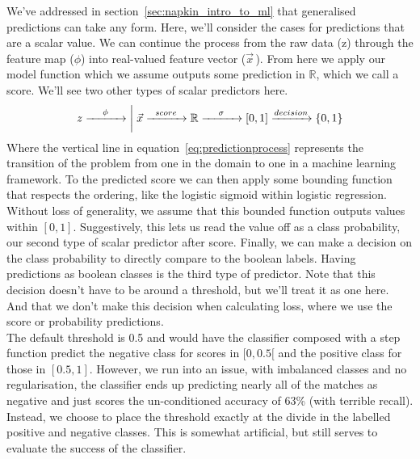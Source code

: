 \documentclass[12pt,a4paper]{article}
\begin{document}
We've addressed in section~\ref{sec:napkin_intro_to_ml} that generalised predictions can take any form. Here, we'll consider the cases for predictions that are a scalar value. We can continue the process from the raw data (z) through the feature map ($\phi$) into real-valued feature vector ($\vec{x}$\,). From here we apply our model function which we assume outputs some prediction in $\mathbb{R}$, which we call a score. We'll see two other types of scalar predictors here.\\
{\large
\begin{equation}
    \label{eq:predictionprocess}
    z \xrightarrow{\mathmakebox[3em]{\phi}} \bigg\rvert \; \vec{x} \xrightarrow{\mathmakebox[3em]{score}} \mathbb{R} \xrightarrow{\mathmakebox[3em]{\sigma}} [0,1] \xrightarrow{\mathmakebox[3em]{decision}} \{0,1\}
\end{equation}}
Where the vertical line in equation~\ref{eq:predictionprocess} represents the transition of the problem from one in the domain to one in a machine learning framework. To the predicted score we can then apply some bounding function that respects the ordering, like the logistic sigmoid within logistic regression. Without loss of generality, we assume that this bounded function outputs values within $[0,1]$. Suggestively, this lets us read the value off as a class probability, our second type of scalar predictor after score. Finally, we can make a decision on the class probability to directly compare to the boolean labels. Having predictions as boolean classes is the third type of predictor. Note that this decision doesn't have to be around a threshold, but we'll treat it as one here. And that we don't make this decision when calculating loss, where we use the score or probability predictions. \\

The default threshold is 0.5 and would have the classifier composed with a step function predict the negative class for scores in $[0,0.5[$ and the positive class for those in $[0.5,1]$. However, we run into an issue, with imbalanced classes and no regularisation, the classifier ends up predicting nearly all of the matches as negative and just scores the un-conditioned accuracy of 63\% (with terrible recall). Instead, we choose to place the threshold exactly at the divide in the labelled positive and negative classes. This is somewhat artificial, but still serves to evaluate the success of the classifier.\\
\end{document}
